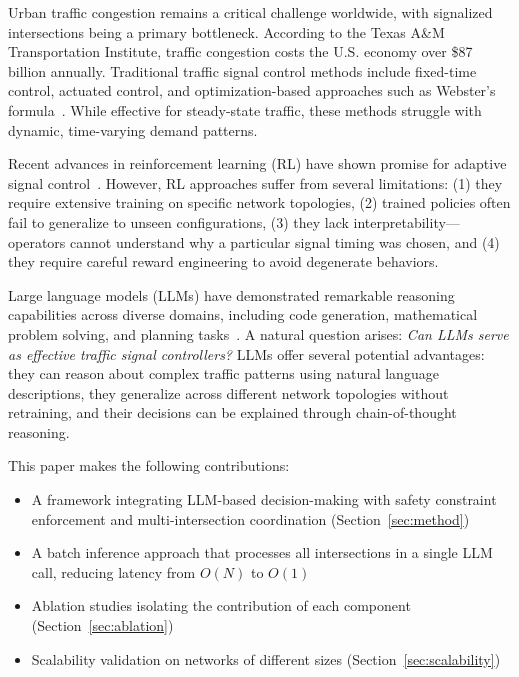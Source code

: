 \documentclass[conference]{IEEEtran}
\begin{document}
Urban traffic congestion remains a critical challenge worldwide, with signalized intersections being a primary bottleneck. According to the Texas A\&M Transportation Institute, traffic congestion costs the U.S. economy over \$87 billion annually. Traditional traffic signal control methods include fixed-time control, actuated control, and optimization-based approaches such as Webster's formula~\cite{webster1958}. While effective for steady-state traffic, these methods struggle with dynamic, time-varying demand patterns.

Recent advances in reinforcement learning (RL) have shown promise for adaptive signal control~\cite{wei2019, zheng2019}. However, RL approaches suffer from several limitations: (1) they require extensive training on specific network topologies, (2) trained policies often fail to generalize to unseen configurations, (3) they lack interpretability---operators cannot understand why a particular signal timing was chosen, and (4) they require careful reward engineering to avoid degenerate behaviors.

Large language models (LLMs) have demonstrated remarkable reasoning capabilities across diverse domains, including code generation, mathematical problem solving, and planning tasks~\cite{hong2023}. A natural question arises: \emph{Can LLMs serve as effective traffic signal controllers?} LLMs offer several potential advantages: they can reason about complex traffic patterns using natural language descriptions, they generalize across different network topologies without retraining, and their decisions can be explained through chain-of-thought reasoning.

This paper makes the following contributions:
\begin{itemize}[nosep]
    \item A framework integrating LLM-based decision-making with safety constraint enforcement and multi-intersection coordination (Section~\ref{sec:method})
    \item A batch inference approach that processes all intersections in a single LLM call, reducing latency from $O(N)$ to $O(1)$
    \item Ablation studies isolating the contribution of each component (Section~\ref{sec:ablation})
    \item Scalability validation on networks of different sizes (Section~\ref{sec:scalability})
\end{itemize}


\end{document}
